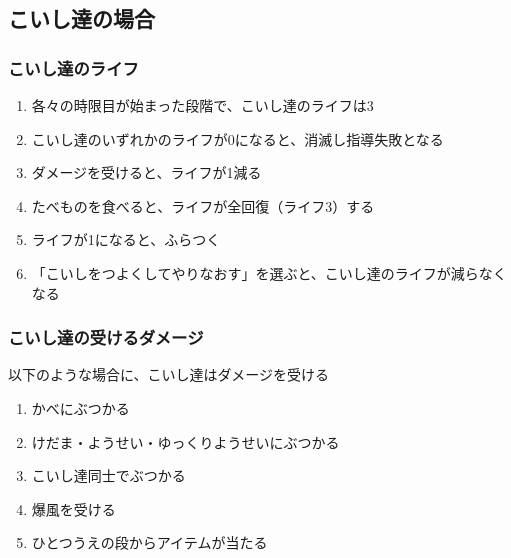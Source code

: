 \subsection{こいし達の場合}

\subsubsection{こいし達のライフ}
\begin{enumerate}[label={\sarrow}]
\item 各々の時限目が始まった段階で、こいし達のライフは3
\item こいし達のいずれかのライフが0になると、消滅し指導失敗となる
\item ダメージを受けると、ライフが1減る
\item たべものを食べると、ライフが全回復（ライフ3）する
\item ライフが1になると、ふらつく
\item 「こいしをつよくしてやりなおす」を選ぶと、こいし達のライフが減らなくなる
\end{enumerate}

\subsubsection{こいし達の受けるダメージ}
以下のような場合に、こいし達はダメージを受ける
\begin{enumerate}[label={\sarrow}]
\item かべにぶつかる
\item けだま・ようせい・ゆっくりようせいにぶつかる
\item こいし達同士でぶつかる
\item 爆風を受ける
\item ひとつうえの段からアイテムが当たる
\end{enumerate}


